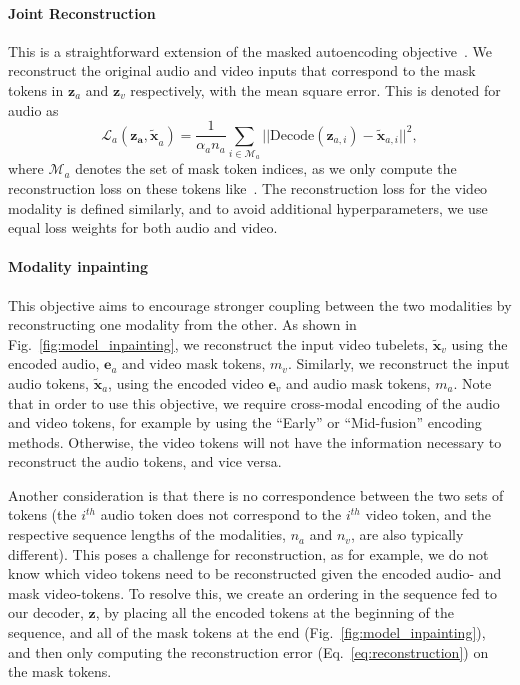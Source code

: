 \documentclass[10pt,twocolumn,letterpaper]{article}
\def \paravspace {-1\baselineskip}
\begin{document}
\paragraph{Joint Reconstruction}
This is a straightforward extension of the masked autoencoding objective~\cite{he2022masked}.
We reconstruct the original audio and video inputs that correspond to the mask tokens in $\mathbf{z}_a$ and $\mathbf{z}_v$ respectively, with the mean square error.
This is denoted for audio as
\vspace{-0.25\baselineskip}
\begin{equation}
\mathcal L_a(\mathbf{\mathbf{z}_a, \tilde{x}}_a) = \frac{1}{\alpha_a n_a} \sum_{i \in \mathcal{M}_a} || \text{Decode}(\mathbf{z}_{a, i}) - \tilde{\mathbf{x}}_{a, i} ||^{2},
\label{eq:reconstruction}
\end{equation}
where $\mathcal{M}_a$ denotes the set of mask token indices, as we only compute the reconstruction loss on these tokens like~\cite{he2022masked,feichtenhofer2022masked,wei2022masked}.
The reconstruction loss for the video modality is defined similarly, and to avoid additional hyperparameters, we use equal loss weights for both audio and video. 

\vspace{\paravspace}
\paragraph{Modality inpainting}
This objective aims to encourage stronger coupling between the two modalities by reconstructing one modality from the other. As shown in Fig.~\ref{fig:model_inpainting}, we reconstruct the input video tubelets, $\mathbf{\tilde{x}}_v$ using the encoded audio, $\mathbf{e}_a$ and video mask tokens, $m_v$. 
Similarly, we reconstruct the input audio tokens, $\mathbf{\tilde{x}}_a$, using the encoded video $\mathbf{e}_v$ and audio mask tokens, $m_a$.
Note that in order to use this objective, we require cross-modal encoding of the audio and video tokens, for example by using the ``Early'' or ``Mid-fusion'' encoding methods.
Otherwise, the video tokens will not have the information necessary to reconstruct the audio tokens, and vice versa.



Another consideration is that there is no correspondence between the two sets of tokens (\ie the $i^{th}$ audio token does not correspond to the $i^{th}$ video token, and the respective sequence lengths of the modalities, $n_a$ and $n_v$, are also typically different).
This poses a challenge for reconstruction, as for example, we do not know which video tokens need to be reconstructed given the encoded audio- and mask video-tokens.
To resolve this, we create an ordering in the sequence fed to our decoder, $\mathbf{z}$, by placing all the encoded tokens at the beginning of the sequence, and all of the mask tokens at the end (Fig.~\ref{fig:model_inpainting}), and then only computing the reconstruction error (Eq.~\ref{eq:reconstruction}) on the mask tokens.
\end{document}
